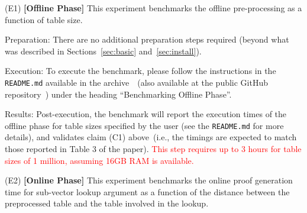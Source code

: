 \documentclass[sigconf]{acmart}
\begin{document}
	\begin{compactitem}
		\item[(E1)] \textbf{[Offline Phase]} This experiment benchmarks the offline pre-processing as a function of table size. 
		
		
		\begin{asparadesc}
			\item[Preparation:] There are no additional preparation steps required (beyond what was described in Sections~\ref{sec:basic} and~\ref{sec:install}).
			
			\item[Execution:] To execute the benchmark, please follow the instructions in the {\tt README.md} available in the archive~\cite{artifact-archive}~(also available at the public GitHub repository~\cite{github-archive}) under the heading ``Benchmarking Offline Phase''.
			
			\item[Results:] Post-execution, the benchmark will report the execution times of the offline phase for table sizes specified by the user (see the {\tt README.md} for more details), and validates claim (C1) above~(i.e., the timings are expected to match those reported in Table 3 of the paper). \textcolor{red}{This step requires up to 3 hours for table sizes of 1 million, assuming 16GB RAM is available.}
		\end{asparadesc}
		
		\item[(E2)] \textbf{[Online Phase]} This experiment benchmarks the online proof generation time for sub-vector lookup argument as a function of the distance between the preprocessed table and the table involved in the lookup. 
		
		

\end{compactitem}
\end{document}
